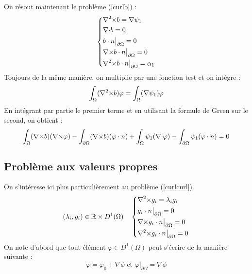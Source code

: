On résout maintenant le problème (\ref{curlb}) :
\begin{eqnarray*}
\left\{
\begin{aligned}
&{\nabla^2\times} b = \nabla\psi_1\\
&{\nabla\cdot} b = 0\\
&b\cdot n\big\rvert_{\partial\Omega} = 0\\
&{\nabla\times} b\cdot n\big\rvert_{\partial\Omega} = 0\\
&{\nabla^2\times} b\cdot n\big\rvert_{\partial\Omega} = \alpha_1
\end{aligned}
\right.
\end{eqnarray*}
Toujours de la même manière, on multiplie par une fonction test et on intégre :
\[
\int_\Omega ({\nabla^2\times} b) \varphi = \int_\Omega (\nabla\psi_1)\varphi
\]
En intégrant par partie le premier terme et en utilisant la formule de Green sur le second, on obtient :
\begin{eqnarray}
\label{fvrelev}
\int_\Omega ({\nabla\times} b)({\nabla\times}\varphi) - \int_{\partial\Omega} ({\nabla\times} b)(\varphi\cdot n) +\int_\Omega \psi_1({\nabla\cdot}\varphi) - \int_{\partial\Omega} \psi_1(\varphi\cdot n) = 0
\end{eqnarray}

\subsection{Problème aux valeurs propres}
\label{eigen}

On s'intéresse ici plus particulièrement au problème (\ref{curlcurl}).
\begin{eqnarray*}
(\lambda_i,g_i)\in{\mathbb{R}}\times D^1(\Omega)\quad \left\{
\begin{aligned}
&{\nabla^2\times}  g_i = \lambda_i g_i\\
&g_i\cdot n\big\rvert_{\partial\Omega} = 0\\
&{\nabla\times} g_i\cdot n\big\rvert_{\partial\Omega} = 0\\
&{\nabla^2\times}  g_i\cdot n\big\rvert_{\partial\Omega} = 0
\end{aligned}
\right.
\end{eqnarray*}
On note d'abord que tout élément $\varphi\in D^1(\Omega)$ peut s'écrire de la manière suivante :
\[
\varphi = \varphi_0 + \nabla\phi\text{ et } \varphi\big\rvert_{\partial\Omega} = \nabla\phi
\]

